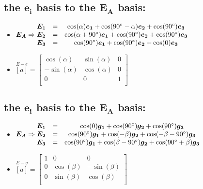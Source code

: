 \documentclass[10pt, letterpaper]{article}
\begin{document}
	\subsection{ the $\bm{e_i}$ basis to the $\bm{E_A}$ basis:}
		\begin{itemize} 
			\item $\bm{E_A} \Rightarrow \begin{matrix*} 
				\bm{E_1} & = & \cos(\alpha) \bm{e_1}  + 
				 \cos(90 \degree - \alpha) \bm{e_2} + \cos(90 \degree)\bm{e_3} \\
				 
				 \bm{E_2} & = & \cos(\alpha + 90 \degree) \bm{e_1}  + 
				 \cos(90 \degree) \bm{e_2} + \cos(90 \degree)\bm{e_3} \\
				 
				 \bm{E_3} & = & \cos(90 \degree) \bm{e_1} + 
				 \cos(90 \degree ) \bm{e_2} + \cos(0)\bm{e_3} \\
			\end{matrix*}$
		
		\item $\overset{E - e}{[a]} = \begin{bmatrix}
				\cos(\alpha) & \sin( \alpha)  & 0 \\
				-\sin(\alpha) & \cos(\alpha ) &0 \\
				0 & 0 & 1 \\
			\end{bmatrix}$

			\end{itemize}
	\subsection{ the $\bm{e_i}$ basis to the $\bm{E_A}$ basis:}
		\begin{itemize} 
			\item $\bm{E_A} \Rightarrow \begin{matrix*} 
				\bm{E_1} & = & \cos(0) \bm{g_1}  + 
				 \cos(90 \degree) \bm{g_2} + \cos(90 \degree)\bm{g_3} \\
				 
				 \bm{E_2} & = & \cos(90 \degree) \bm{g_1}  + 
				 \cos(-\beta) \bm{g_2} + \cos(-\beta -90 \degree)\bm{g_3} \\
				 
				 \bm{E_3} & = & \cos(90 \degree) \bm{g_1} + 
				 \cos(\beta - 90 \degree) \bm{g_2} + \cos(90\degree + \beta)\bm{g_3} \\
			\end{matrix*}$
		
		\item $\overset{E - g}{[a]} = \begin{bmatrix}
				1 & 0  & 0 \\
				0 & \cos(\beta ) & -\sin(\beta) \\
				0 & \sin(\beta) & \cos(\beta) \\
			\end{bmatrix}$
		
			\end{itemize}
	
\end{document}
